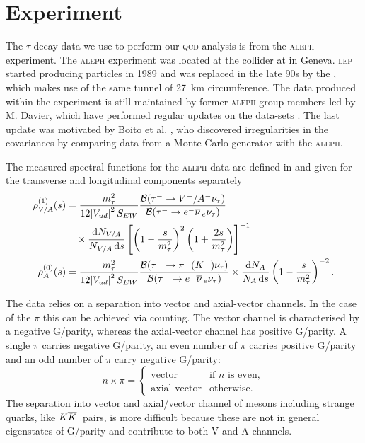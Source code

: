 \documentclass[../../index.tex]{subfiles}
\begin{document}
\section{Experiment}
The \(\tau\) decay data we use to perform our \textsc{qcd} analysis is from the
\textsc{aleph} experiment. The \textsc{aleph} experiment was located at the
 collider at  in Geneva. \textsc{lep} started producing
particles in 1989 and was replaced in the late 90s by the
, which makes use of the same tunnel of
\SI{27}{\kilo\meter} circumference. The data produced within the experiment is
still maintained by former \textsc{aleph} group members led by M. Davier, which
have performed regular updates on the data-sets
\cite{Davier2013,Davier2008,Aleph2005}. The last update was motivated by Boito
et al. \cite{Boito2010}, who discovered irregularities in the covariances by
comparing data from a Monte Carlo generator with the \textsc{aleph}.

The measured spectral functions for the \textsc{aleph} data are defined in
\cite{Davier2007} and given for the transverse and longitudinal components
separately
\begin{equation}
  \begin{split}
    \rho^{(1)}_{V/A}(s) &= \frac{m_\tau^2}{12 \abs{V_{ud}}^2S_{EW}} \frac{\mathcal{B}(\tau^- \to V^-/A^- \nu_\tau)}{\mathcal{B}(\tau^- \to e^- \anti{\nu}_e \nu_\tau)} \\
    &\quad\times \frac{\dif N_{V/A}}{N_{V/A}\dif s} \left[ \left( 1 - \frac{s}{m_\tau^2} \right)^2 \left( 1 + \frac{2s}{m_\tau^2} \right) \right]^{-1} \\
    \rho^{(0)}_{A}(s) &= \frac{m_\tau^2}{12 \abs{V_{ud}}^2 S_{EW}}
    \frac{\mathcal{B}(\tau^- \to \pi^-(K^-) \nu_\tau)}{\mathcal{B}(\tau^- \to
      e^- \anti{\nu}_e \nu_\tau)} \times \frac{\dif N_A}{N_A \dif s} \left( 1 -
      \frac{s}{m_\tau^2} \right)^{-2}.
  \end{split}
\end{equation}

The data relies on a separation into vector and axial-vector channels. In the
case of the \(\pi\) this can be achieved via counting. The vector channel is
characterised by a negative G\-/parity, whereas the axial-vector channel has
positive G\-/parity. A single \(\pi\) carries negative G\-/parity, an even
number of \(\pi\) carries positive G\-/parity and an odd number of \(\pi\)
carry negative G\-/parity:
\begin{equation}
  n \times \pi = \begin{cases} \mbox{vector} & \mbox{if } n \text{ is even}, \\ \mbox{axial-vector} & \mbox{otherwise.} \end{cases}
\end{equation}
The separation into vector and axial\-/vector channel of mesons including
strange quarks, like \(K\overline{K}\,\) pairs, is more difficult because these are
not in general eigenstates of G\-/parity and contribute to both \textsc{V} and
\textsc{A} channels.
\end{document}

